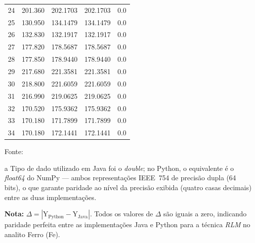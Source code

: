 \begin{table}[H]
\begin{threeparttable}
{\begin{tabular}{
    S[table-format=2.0]
    S[table-format=3.3]
    S[table-format=3.4]
    S[table-format=3.4]
    S[table-format=1.1]
}
24  & 201.360  & 202.1703  & 202.1703  & 0.0 \\
25  & 130.950  & 134.1479  & 134.1479  & 0.0 \\
26  & 132.830  & 132.1917  & 132.1917  & 0.0 \\
27  & 177.820  & 178.5687  & 178.5687  & 0.0 \\
28  & 177.850  & 178.9440  & 178.9440  & 0.0 \\
29  & 217.680  & 221.3581  & 221.3581  & 0.0 \\
30  & 218.800  & 221.6059  & 221.6059  & 0.0 \\
31  & 216.990  & 219.0625  & 219.0625  & 0.0 \\
32  & 170.520  & 175.9362  & 175.9362  & 0.0 \\
33  & 170.180  & 171.7899  & 171.7899  & 0.0 \\
34  & 170.180  & 172.1441  & 172.1441  & 0.0 \\
\bottomrule
\end{tabular}%
}
\begin{center}
\begin{minipage}{0.85\linewidth}
\begin{tablenotes}
\footnotesize
\item Fonte:~\oautor
\item[a] Tipo de dado utilizado em Java foi o \textit{double}; no Python,
o equivalente é o \textit{float64} do NumPy — ambos representações IEEE~754
de precisão dupla (64 bits), o que garante paridade ao nível da precisão exibida (quatro casas decimais) entre as
duas implementações.
\item \textbf{Nota:} $\Delta = |\text{Y}_{\text{Python}} - \text{Y}_{\text{Java}}|$.
Todos os valores de $\Delta$ são iguais a zero, indicando paridade
perfeita entre as implementações Java e Python para a técnica \textit{RLM}
no analito Ferro (Fe).
\end{tablenotes}
\end{minipage}
\end{center}
\end{threeparttable}
\end{table}


